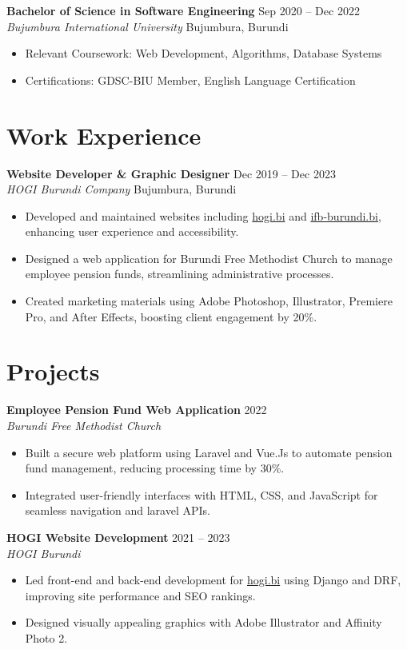 \documentclass[10pt,letterpaper]{article}
\newcommand{\entry}[4]{\textbf{#1} \hfill #2 \\ \textit{#3} \hfill #4 \\}
\newcommand{\project}[3]{\textbf{#1} \hfill #2 \\ \textit{#3} \\}
\begin{document}
\entry{Bachelor of Science in Software Engineering}{Sep 2020 -- Dec 2022}
{Bujumbura International University}{Bujumbura, Burundi}
\begin{itemize}[leftmargin=*,nosep]
    \item Relevant Coursework: Web Development, Algorithms, Database Systems
    \item Certifications: GDSC-BIU Member, English Language Certification
\end{itemize}

\section*{Work Experience}
\entry{Website Developer \& Graphic Designer}{Dec 2019 -- Dec 2023}
{HOGI Burundi Company}{Bujumbura, Burundi}
\begin{itemize}[leftmargin=*,nosep]
    \item Developed and maintained websites including \href{https://hogi.bi}{hogi.bi} and \href{https://ifb-burundi.bi}{ifb-burundi.bi}, enhancing user experience and accessibility.
    \item Designed a web application for Burundi Free Methodist Church to manage employee pension funds, streamlining administrative processes.
    \item Created marketing materials using Adobe Photoshop, Illustrator, Premiere Pro, and After Effects, boosting client engagement by 20\%.
\end{itemize}

\section*{Projects}
\project{Employee Pension Fund Web Application}{2022}{Burundi Free Methodist Church}
\begin{itemize}[leftmargin=*,nosep]
    \item Built a secure web platform using Laravel and Vue.Js to automate pension fund management, reducing processing time by 30\%.
    \item Integrated user-friendly interfaces with HTML, CSS, and JavaScript for seamless navigation and laravel APIs.
\end{itemize}

\project{HOGI Website Development}{2021 -- 2023}{HOGI Burundi}
\begin{itemize}[leftmargin=*,nosep]
    \item Led front-end and back-end development for \href{https://hogi.bi}{hogi.bi} using Django and DRF, improving site performance and SEO rankings.
    \item Designed visually appealing graphics with Adobe Illustrator and Affinity Photo 2.
\end{itemize}
\end{document}
